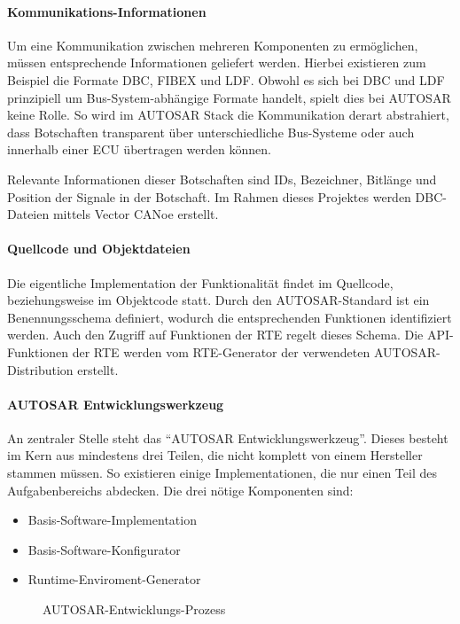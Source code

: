 \documentclass[
  a4paper,					    %
  twoside,
  DIV=calc,     				%
  bibliography=totoc,
  cleardoublepage=empty,
  ngerman,     					%
  final       					%
]{scrbook}
\begin{document}
\paragraph{Kommunikations-Informationen}
Um eine Kommunikation zwischen mehreren Komponenten zu ermöglichen, müssen entsprechende Informationen geliefert werden. Hierbei existieren zum Beispiel die Formate DBC, FIBEX und LDF. Obwohl es sich bei DBC und LDF prinzipiell um Bus-System-abhängige Formate handelt, spielt dies bei AUTOSAR keine Rolle. So wird im AUTOSAR Stack die Kommunikation derart abstrahiert, dass Botschaften transparent über unterschiedliche Bus-Systeme oder auch innerhalb einer ECU übertragen werden können.

Relevante Informationen dieser Botschaften sind IDs, Bezeichner, Bitlänge und Position der Signale in der Botschaft. Im Rahmen dieses Projektes werden DBC-Dateien mittels Vector CANoe erstellt.

\paragraph{Quellcode und Objektdateien}
Die eigentliche Implementation der Funktionalität findet im Quellcode, beziehungsweise im Objektcode statt. Durch den AUTOSAR-Standard ist ein Benennungsschema definiert, wodurch die entsprechenden Funktionen identifiziert werden. Auch den Zugriff auf Funktionen der RTE regelt dieses Schema. Die API-Funktionen der RTE werden vom RTE-Generator der verwendeten AUTOSAR-Distribution erstellt.

\paragraph{AUTOSAR Entwicklungswerkzeug}
An zentraler Stelle steht das "`AUTOSAR Entwicklungswerkzeug"'. Dieses besteht im Kern aus mindestens drei Teilen, die nicht komplett von einem Hersteller stammen müssen. So existieren einige Implementationen, die nur einen Teil des Aufgabenbereichs abdecken. Die drei nötige Komponenten sind:

\begin{itemize}
    \item Basis-Software-Implementation
    \item Basis-Software-Konfigurator
    \item Runtime-Enviroment-Generator
\end{itemize}

\begin{figure}[ht]
    \centering
    \resizebox{\linewidth}{!}{}
    \caption{AUTOSAR-Entwicklungs-Prozess}
    \label{fig:autosar_prozess}
\end{figure}
\end{document}
